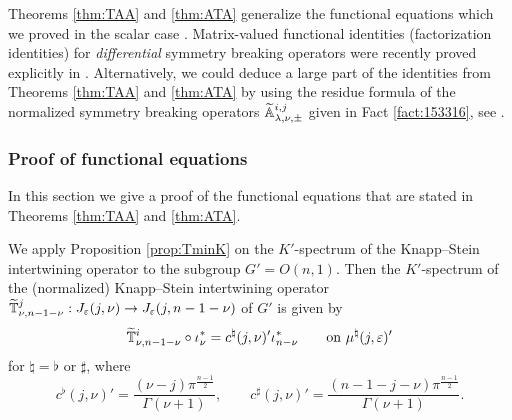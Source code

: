 \begin{remark}
Theorems \ref{thm:TAA} and \ref{thm:ATA} generalize 
 the functional equations 
 which we proved in the scalar case
 \cite[Thm.~8.5]{sbon}.  
Matrix-valued functional identities
 (factorization identities)
 for {\it{differential}} symmetry breaking operators
 were recently proved explicitly
 in \cite[Chap. 13]{KKP}.  
Alternatively,
 we could deduce a large part of the identities 
\cite[Chap.~13]{KKP} from Theorems \ref{thm:TAA}
 and \ref{thm:ATA}
 by using the residue formula 
 of the normalized symmetry breaking operators
 ${\widetilde{\mathbb{A}}}_{{\lambda},{\nu},{\pm}}^{{i,j}}$
 given in Fact \ref{fact:153316}, see \cite{xkresidue}.  
\end{remark}


\subsubsection{Proof of functional equations}
\label{subsec:fi}

In this section
 we give a proof 
 of the functional equations
 that are stated
 in Theorems \ref{thm:TAA} and \ref{thm:ATA}.  



We apply Proposition \ref{prop:TminK}
 on the $K'$-spectrum 
 of the Knapp--Stein intertwining operator
 to the subgroup $G'=O(n,1)$.  
Then the $K'$-spectrum of the (normalized) Knapp--Stein intertwining operator
$
\widetilde{{\mathbb{T}}}_{{\nu},{n-1-\nu}}^{{j}} : J_{\varepsilon}(j,\nu) \to J_{\varepsilon}(j,n-1-\nu)
$
 of $G'$ is given by 
\[
   \widetilde{{\mathbb{T}}}_{{\nu},{n-1-\nu}}^{{i}} \circ \iota_{\nu}^{\ast}
  =
  c^{\natural}(j,\nu)' \iota_{n-\nu}^{\ast}
\qquad
\text{on $\mu^{\natural}(j,\varepsilon)'$}
\]
for $\natural =\flat$ or $\sharp$, 
 where 
\[
  c^{\flat}(j,\nu)'=\frac{(\nu-j) \pi^{\frac {n-1} 2}}{\Gamma(\nu+1)}, 
\qquad
c^{\sharp}(j,\nu)'=\frac{(n-1-j-\nu) \pi^{\frac {n-1} 2}}{\Gamma(\nu+1)}.   
\]



